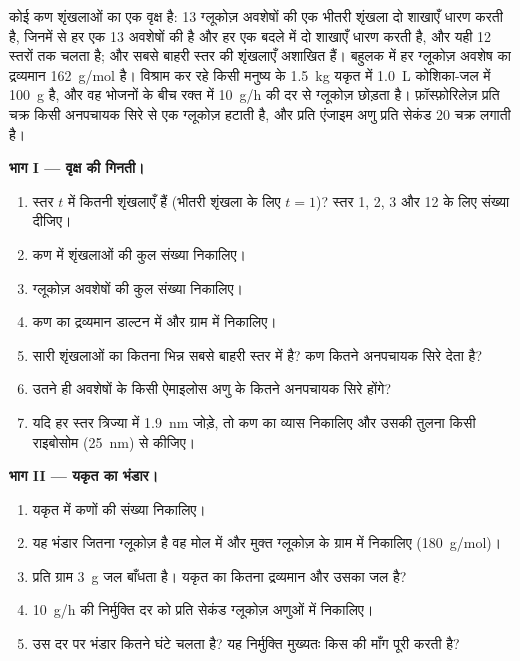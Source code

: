 \begin{problem}
\label{pb:b1:carbohydrates:1}
कोई  कण शृंखलाओं का एक वृक्ष है: \qty{13}{} ग्लूकोज़ अवशेषों की
एक भीतरी शृंखला दो शाखाएँ धारण करती है, जिनमें से हर एक \qty{13}{}
अवशेषों की है और हर एक बदले में दो शाखाएँ धारण करती है, और यही
\qty{12}{} स्तरों तक चलता है; और सबसे बाहरी स्तर की शृंखलाएँ अशाखित हैं।
बहुलक में हर ग्लूकोज़ अवशेष का द्रव्यमान \qty{162}{g/mol} है। विश्राम कर
रहे किसी मनुष्य के \qty{1.5}{kg} यकृत में \qty{1.0}{L} कोशिका-जल में
\qty{100}{g}  है, और वह भोजनों के बीच रक्त में
\qty{10}{g/h} की दर से ग्लूकोज़ छोड़ता है।  फ़ॉस्फ़ोरिलेज़
प्रति चक्र किसी अनपचायक सिरे से एक ग्लूकोज़ हटाती है, और प्रति एंजाइम अणु
प्रति सेकंड \qty{20}{} चक्र लगाती है।

\medskip
\noindent\textbf{भाग I --- वृक्ष की गिनती।}
\begin{enumerate}
  \item स्तर $t$ में कितनी शृंखलाएँ हैं (भीतरी शृंखला के लिए
        $t = 1$)? स्तर 1, 2, 3 और 12 के लिए संख्या दीजिए।
  \item कण में शृंखलाओं की कुल संख्या निकालिए।
  \item ग्लूकोज़ अवशेषों की कुल संख्या निकालिए।
  \item कण का द्रव्यमान डाल्टन में और ग्राम में निकालिए।
  \item सारी शृंखलाओं का कितना भिन्न सबसे बाहरी स्तर में है? कण कितने
        अनपचायक सिरे देता है?
  \item उतने ही अवशेषों के किसी ऐमाइलोस अणु के कितने अनपचायक सिरे
        होंगे?
  \item यदि हर स्तर त्रिज्या में \qty{1.9}{nm} जोड़े, तो कण का व्यास
        निकालिए और उसकी तुलना किसी राइबोसोम
        (\qty{25}{nm}) से कीजिए।
\end{enumerate}

\medskip
\noindent\textbf{भाग II --- यकृत का भंडार।}
\begin{enumerate}[resume]
  \item यकृत में कणों की संख्या निकालिए।
  \item यह भंडार जितना ग्लूकोज़ है वह मोल में और मुक्त ग्लूकोज़ के
        ग्राम में निकालिए (\qty{180}{g/mol})।
  \item {} प्रति ग्राम \qty{3}{g} जल बाँधता है। यकृत का कितना
        द्रव्यमान  और उसका जल है?
  \item \qty{10}{g/h} की निर्मुक्ति दर को प्रति सेकंड ग्लूकोज़ अणुओं
        में निकालिए।
  \item उस दर पर भंडार कितने घंटे चलता है? यह निर्मुक्ति मुख्यतः किस 
        की माँग पूरी करती है?
\end{enumerate}


\end{problem}
